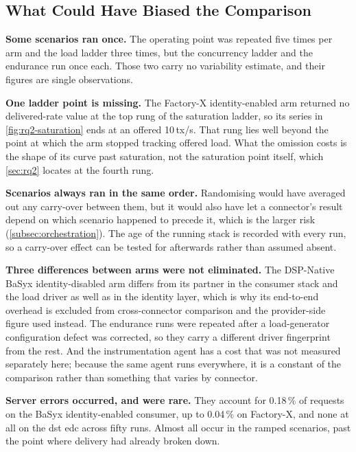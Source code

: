 \subsection{What Could Have Biased the Comparison}\label{subsec:tv-internal}

\textbf{Some scenarios ran once.} The operating point was repeated five times per arm and
the load ladder three times, but the concurrency ladder and the endurance run once each.
Those two carry no variability estimate, and their figures are single observations.

\textbf{One ladder point is missing.} The Factory-X identity-enabled arm returned no
delivered-rate value at the top rung of the saturation ladder, so its series in
\cref{fig:rq2-saturation} ends at an offered 10\,tx/s. That rung lies well beyond the point at which the arm stopped tracking offered load. What the omission costs is the shape of its curve past saturation, not the saturation point itself, which \cref{sec:rq2} locates at the fourth rung.

\textbf{Scenarios always ran in the same order.} Randomising would have averaged out any
carry-over between them, but it would also have let a connector's result depend on which
scenario happened to precede it, which is the larger risk (\cref{subsec:orchestration}).
The age of the running stack is recorded with every run, so a carry-over effect can be
tested for afterwards rather than assumed absent.

\textbf{Three differences between arms were not eliminated.} The DSP-Native BaSyx
identity-disabled arm differs from its partner in the consumer stack and the load driver
as well as in the identity layer, which is why its end-to-end overhead is excluded from
cross-connector comparison and the provider-side figure used instead. The endurance runs
were repeated after a load-generator configuration defect was corrected, so they carry a
different driver fingerprint from the rest. And the instrumentation agent has a cost that
was not measured separately here; because the same agent runs everywhere, it is a constant
of the comparison rather than something that varies by connector.

\textbf{Server errors occurred, and were rare.} They account for 0.18\,\% of requests on
the BaSyx identity-enabled consumer, up to 0.04\,\% on Factory-X, and none at all on the
\gls{dst} \gls{edc} across fifty runs. Almost all occur in the ramped scenarios,
past the point where delivery had already broken down.
